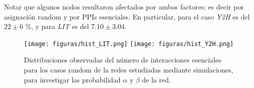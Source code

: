 Notar que algunos nodos resultaron afectados por ambos factores; es decir por asignaci\'on random y por PPIs esenciales. 
En particular, para el caso {\it Y2H} es del $22 \pm 6$ \%, y para {\it LIT} es del $7.10 \pm 3.04$.

\begin{figure}
\centering
\texttt{[image: figuras/hist\_LIT.png]} 
\texttt{[image: figuras/hist\_Y2H.png]} \\
\caption{Distribuciones observadas del n\'umero de interacciones esenciales para los casos random de la redes estudiadas mediante simulaciones, para investigar las probabilidad $\alpha$ y $\beta$ de la red.}
\label{fig:remocion_alternativo}
\end{figure}

